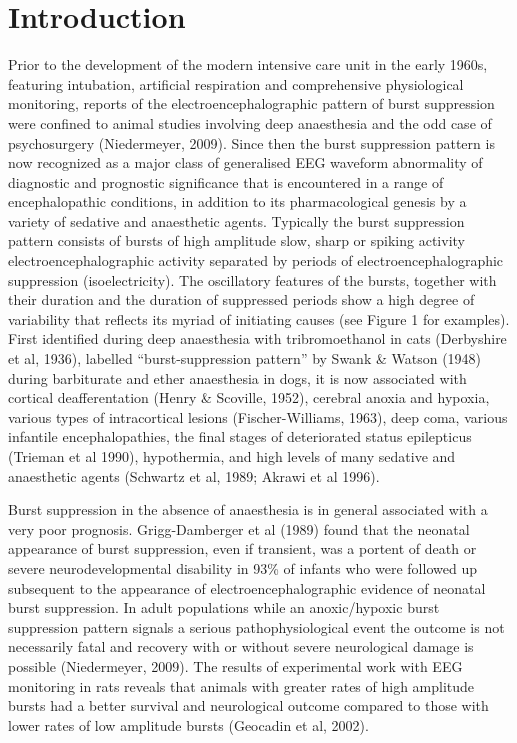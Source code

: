 \documentclass[a4paper,12pt]{article}
\begin{document}
\section{Introduction}
Prior to the development of the modern intensive care unit in the early
1960s, featuring intubation, artificial respiration and comprehensive
physiological monitoring, reports of the electroencephalographic
pattern of burst suppression were confined to animal studies involving
deep anaesthesia and the odd case of psychosurgery (Niedermeyer,
2009). Since then the burst suppression pattern is now recognized as
a major class of generalised EEG waveform abnormality of diagnostic
and prognostic significance that is encountered in a range of
encephalopathic conditions, in addition to its pharmacological genesis
by a variety of sedative and anaesthetic agents. Typically the burst
suppression pattern consists of bursts of high amplitude slow, sharp or
spiking activity electroencephalographic activity separated by periods
of electroencephalographic suppression (isoelectricity). The oscillatory
features of the bursts, together with their duration and the duration of
suppressed periods show a high degree of variability that reflects its
myriad of initiating causes (see Figure 1 for examples). First identified
during deep anaesthesia with tribromoethanol in cats (Derbyshire et al,
1936), labelled “burst-suppression pattern” by Swank \& Watson (1948) during barbiturate and ether anaesthesia in dogs,
it is now
associated with cortical deafferentation (Henry \& Scoville, 1952),
cerebral anoxia and hypoxia, various types of intracortical lesions
(Fischer-Williams, 1963), deep coma, various infantile
encephalopathies, the final stages of deteriorated status epilepticus
(Trieman et al 1990), hypothermia, and high levels of many sedative
and anaesthetic agents (Schwartz et al, 1989; Akrawi et al 1996).

Burst suppression in the absence of anaesthesia is in general
associated with a very poor prognosis. Grigg-Damberger et al (1989)
found that the neonatal appearance of burst suppression, even if
transient, was a portent of death or severe neurodevelopmental
disability in 93\% of infants who were followed up subsequent to the
appearance of electroencephalographic evidence of neonatal burst
suppression. In adult populations while an anoxic/hypoxic burst
suppression pattern signals a serious pathophysiological event the
outcome is not necessarily fatal and recovery with or without severe
neurological damage is possible (Niedermeyer, 2009). The results of
experimental work with EEG monitoring in rats reveals that animals with
greater rates of high amplitude bursts had a better survival and
neurological outcome compared to those with lower rates of low
amplitude bursts (Geocadin et al, 2002).
\end{document}
